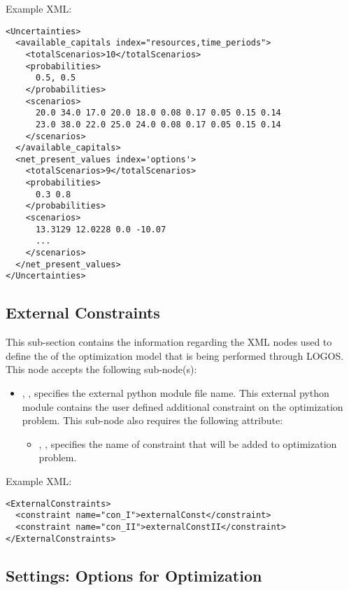 Example XML:
\begin{lstlisting}[style=XML]
<Uncertainties>
  <available_capitals index="resources,time_periods">
    <totalScenarios>10</totalScenarios>
    <probabilities>
      0.5, 0.5
    </probabilities>
    <scenarios>
      20.0 34.0 17.0 20.0 18.0 0.08 0.17 0.05 0.15 0.14
      23.0 38.0 22.0 25.0 24.0 0.08 0.17 0.05 0.15 0.14
    </scenarios>
  </available_capitals>
  <net_present_values index='options'>
    <totalScenarios>9</totalScenarios>
    <probabilities>
      0.3 0.8
    </probabilities>
    <scenarios>
      13.3129 12.0228 0.0 -10.07
      ...
    </scenarios>
  </net_present_values>
</Uncertainties>
\end{lstlisting}


%
\subsection{External Constraints}
\label{subsec:ExternalConstraints}

This sub-section contains the information regarding the XML nodes used to define the
 of the optimization model that is being performed through LOGOS.
This node accepts the following sub-node(s):
\begin{itemize}
  \item {}, , specifies the external python
  module file name. This external python module contains the user defined additional constraint
  on the optimization problem. This sub-node also requires the following attribute:
  \begin{itemize}
    \item {}, , specifies the name of constraint that will
    be added to optimization problem.
  \end{itemize}
\end{itemize}

Example XML:
\begin{lstlisting}[style=XML]
<ExternalConstraints>
  <constraint name="con_I">externalConst</constraint>
  <constraint name="con_II">externalConstII</constraint>
</ExternalConstraints>
\end{lstlisting}


%
\subsection{Settings: Options for Optimization}
\label{subsec:Settings}

